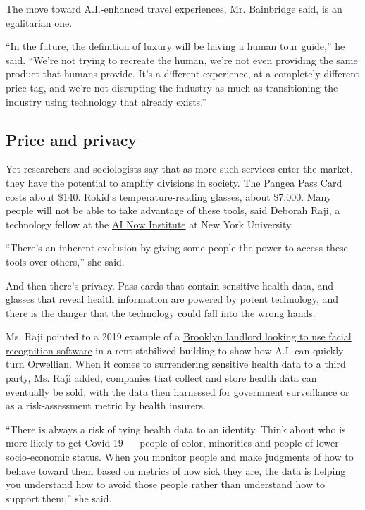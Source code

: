The move toward A.I.-enhanced travel experiences, Mr. Bainbridge said,
is an egalitarian one.

``In the future, the definition of luxury will be having a human tour
guide,'' he said. ``We're not trying to recreate the human, we're not
even providing the same product that humans provide. It's a different
experience, at a completely different price tag, and we're not
disrupting the industry as much as transitioning the industry using
technology that already exists.''

\hypertarget{price-and-privacy}{%
\subsection{Price and privacy}\label{price-and-privacy}}

Yet researchers and sociologists say that as more such services enter
the market, they have the potential to amplify divisions in society. The
Pangea Pass Card costs about \$140. Rokid's temperature-reading glasses,
about \$7,000. Many people will not be able to take advantage of these
tools, said Deborah Raji, a technology fellow at the
\href{https://ainowinstitute.org/}{AI Now Institute} at New York
University.

``There's an inherent exclusion by giving some people the power to
access these tools over others,'' she said.

And then there's privacy. Pass cards that contain sensitive health data,
and glasses that reveal health information are powered by potent
technology, and there is the danger that the technology could fall into
the wrong hands.

Ms. Raji pointed to a 2019 example of a
\href{https://www.nytimes.com/2019/03/28/nyregion/rent-stabilized-buildings-facial-recognition.html}{Brooklyn
landlord looking to use facial recognition software} in a
rent-stabilized building to show how A.I. can quickly turn Orwellian.
When it comes to surrendering sensitive health data to a third party,
Ms. Raji added, companies that collect and store health data can
eventually be sold, with the data then harnessed for government
surveillance or as a risk-assessment metric by health insurers.

``There is always a risk of tying health data to an identity. Think
about who is more likely to get Covid-19 --- people of color, minorities
and people of lower socio-economic status. When you monitor people and
make judgments of how to behave toward them based on metrics of how sick
they are, the data is helping you understand how to avoid those people
rather than understand how to support them,'' she said.

